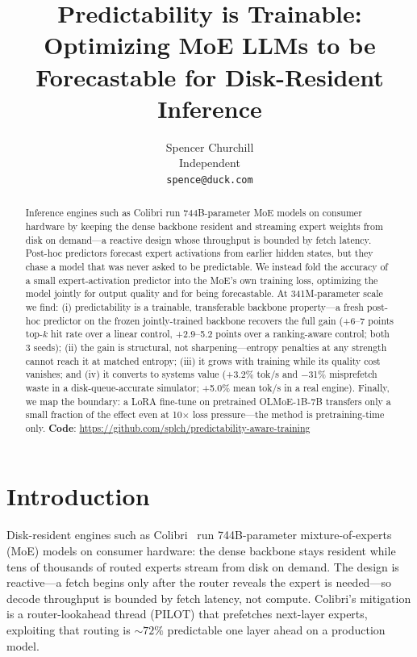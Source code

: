 \documentclass[10pt,letterpaper]{article}
\title{Predictability is Trainable: Optimizing MoE LLMs to be\\Forecastable for Disk-Resident Inference}
\author{Spencer Churchill \\ Independent \\ \texttt{spence@duck.com}}
\date{}
\begin{document}
\maketitle
{\renewcommand{\thefootnote}{}
\setcounter{footnote}{0}}

\begin{abstract}
Inference engines such as Colibri run 744B-parameter MoE models on consumer hardware by keeping the dense backbone resident and streaming expert weights from disk on demand---a reactive design whose throughput is bounded by fetch latency. Post-hoc predictors forecast expert activations from earlier hidden states, but they chase a model that was never asked to be predictable. We instead fold the accuracy of a small expert-activation predictor into the MoE's own training loss, optimizing the model jointly for output quality and for being forecastable. At 341M-parameter scale we find: (i) predictability is a trainable, transferable backbone property---a fresh post-hoc predictor on the frozen jointly-trained backbone recovers the full gain (+6--7 points top-$k$ hit rate over a linear control, +2.9--5.2 points over a ranking-aware control; both 3 seeds); (ii) the gain is structural, not sharpening---entropy penalties at any strength cannot reach it at matched entropy; (iii) it grows with training while its quality cost vanishes; and (iv) it converts to systems value (+3.2\% tok/s and $-$31\% misprefetch waste in a disk-queue-accurate simulator; +5.0\% mean tok/s in a real engine). Finally, we map the boundary: a LoRA fine-tune on pretrained OLMoE-1B-7B transfers only a small fraction of the effect even at 10$\times$ loss pressure---the method is pretraining-time only.
\noindent\textbf{Code}: \url{https://github.com/splch/predictability-aware-training}
\end{abstract}

\section{Introduction}
\label{sec:intro}

Disk-resident engines such as Colibri~\citep{colibri} run 744B-parameter mixture-of-experts (MoE) models on consumer hardware: the dense backbone stays resident while tens of thousands of routed experts stream from disk on demand. The design is reactive---a fetch begins only after the router reveals the expert is needed---so decode throughput is bounded by fetch latency, not compute. Colibri's mitigation is a router-lookahead thread (PILOT) that prefetches next-layer experts, exploiting that routing is ${\sim}72\%$ predictable one layer ahead on a production model.
\end{document}
